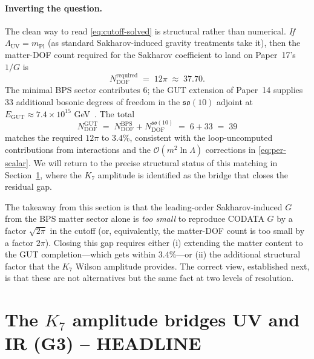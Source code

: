 \documentclass[11pt]{article}
\newcommand{\so}{\mathfrak{so}}
\newcommand{\mPl}{m_{\mathrm{Pl}}}
\begin{document}
\paragraph{Inverting the question.}  The clean way to read
\eqref{eq:cutoff-solved} is structural rather than numerical.
\emph{If} $\Lambda_{\mathrm{UV}} = \mPl$ (as standard
Sakharov-induced gravity treatments take it), then the matter-DOF
count required for the Sakharov coefficient to land on Paper~17's
$1/G$ is
\begin{equation}
  \boxed{\;\;
    N_{\mathrm{DOF}}^{\mathrm{required}}
     \;=\;
     12\pi
     \;\approx\;
     37.70.
  \;\;}
  \label{eq:N-required}
\end{equation}
The minimal BPS sector contributes $6$; the GUT extension of
Paper~14 supplies $33$ additional bosonic degrees of freedom in
the $\so(10)$ adjoint at $E_{\mathrm{GUT}} \approx 7.4 \times 10^{15}$
GeV~\cite{paper14}.  The total
\begin{equation}
  N_{\mathrm{DOF}}^{\mathrm{GUT}}
   \;=\;
   N_{\mathrm{DOF}}^{\mathrm{BPS}} + N_{\mathrm{DOF}}^{\so(10)}
   \;=\;
   6 + 33
   \;=\;
   39
  \label{eq:N-GUT}
\end{equation}
matches the required $12\pi$ to $3.4\%$, consistent with the
loop-uncomputed contributions from interactions and the
$\mathcal{O}(m^2 \ln \Lambda)$ corrections in
\eqref{eq:per-scalar}.  We will return to the precise structural
status of this matching in
Section~\ref{sec:G3-K7-bridge}, where the $K_7$ amplitude is
identified as the bridge that closes the residual gap.

The takeaway from this section is that the leading-order
Sakharov-induced $G$ from the BPS matter sector alone is
\emph{too small} to reproduce CODATA $G$ by a factor
$\sqrt{2\pi}$ in the cutoff (or, equivalently, the matter-DOF count
is too small by a factor $2\pi$).  Closing this gap requires
either (i) extending the matter content to the GUT
completion---which gets within $3.4\%$---or (ii) the additional
structural factor that the $K_7$ Wilson amplitude provides.  The
correct view, established next, is that these are not alternatives
but the same fact at two levels of resolution.

\section{The $K_7$ amplitude bridges UV and IR (G3) -- HEADLINE}
\label{sec:G3-K7-bridge}
\end{document}

